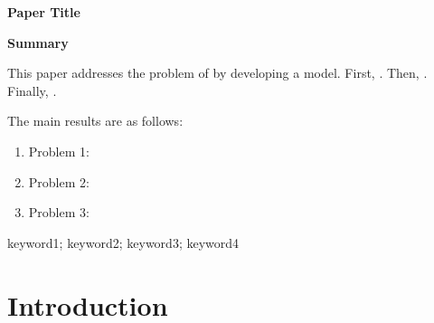 \documentclass[12pt,a4paper]{article}
\newcommand{\mcmtitle}{Paper Title}
\newcommand{\mcmkeywords}{keyword1; keyword2; keyword3; keyword4}
\begin{document}
\begin{center}
    {\Large\bfseries \mcmtitle}

    \vspace{18pt}
    {\large\bfseries Summary}
\end{center}

\vspace{6pt}


This paper addresses the problem of \underline{\hspace{4cm}} by developing
a \underline{\hspace{2cm}} model. First, \underline{\hspace{4cm}}.
Then, \underline{\hspace{4cm}}. Finally, \underline{\hspace{4cm}}.

The main results are as follows:
\begin{enumerate}
    \item Problem 1: \underline{\hspace{6cm}}
    \item Problem 2: \underline{\hspace{6cm}}
    \item Problem 3: \underline{\hspace{6cm}}
\end{enumerate}

\vspace{12pt}
 \mcmkeywords

\newpage


\section{Introduction}
\end{document}

